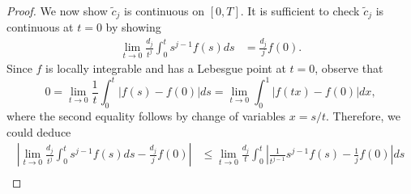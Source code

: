 \documentclass{article}
\theoremstyle{definition}
\newcommand{\pr}[1]{ \left( #1 \right) }
\newcommand{\abs}[1]{\left| #1 \right|}
\begin{document}
\begin{proof}
    We now show $\tilde{c}_j$ is continuous on $[0,T]$. 
    It is sufficient to check $\tilde{c}_j$ is continuous at $t=0$ by showing
    \begin{align*}
        \lim_{t \to 0} \frac{d_j}{t^j} \int^t_0 s^{j-1} f(s) ds &= \frac{d_j}{j}f(0).
    \end{align*}
    Since $f$ is locally integrable and has a Lebesgue point at $t=0$, observe that
    \begin{equation*}
        0 = \lim_{t \to 0} 
        \frac{1}{t} \int_0^t |f(s)-f(0)|ds  
        = 
        \lim_{t \to 0} 
        \int_0^1 |f(tx) - f(0)|dx,
    \end{equation*}
    where the second equality follows by change of variables $x = s/t$. Therefore, we could deduce
    \begin{align*}
        \abs{\lim_{t \to 0} \frac{d_j}{t^j} \int^t_0 s^{j-1} f(s) ds - \frac{d_j}{j}f(0)    
        } &\leq
        \lim_{t \to 0} 
        \frac{d_j}{t} \int_0^t \abs{ \frac{1}{t^{j-1}} s^{j-1} f(s) - \frac{1}{j} f(0)} ds \\

\end{align*}
\end{proof}
\end{document}
